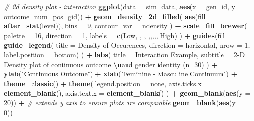 \documentclass[
]{book}
\newenvironment{Shaded}{\begin{snugshade}}{\end{snugshade}}
\newcommand{\AttributeTok}[1]{\textcolor[rgb]{0.13,0.29,0.53}{#1}}
\newcommand{\CommentTok}[1]{\textcolor[rgb]{0.56,0.35,0.01}{\textit{#1}}}
\newcommand{\DecValTok}[1]{\textcolor[rgb]{0.00,0.00,0.81}{#1}}
\newcommand{\FunctionTok}[1]{\textcolor[rgb]{0.13,0.29,0.53}{\textbf{#1}}}
\newcommand{\NormalTok}[1]{#1}
\newcommand{\SpecialCharTok}[1]{\textcolor[rgb]{0.81,0.36,0.00}{\textbf{#1}}}
\newcommand{\StringTok}[1]{\textcolor[rgb]{0.31,0.60,0.02}{#1}}
\begin{document}
\begin{Shaded}
\begin{Highlighting}[]
\CommentTok{\# 2d density plot {-} interaction}
\FunctionTok{ggplot}\NormalTok{(}\AttributeTok{data =}\NormalTok{ sim\_data, }\FunctionTok{aes}\NormalTok{(}\AttributeTok{x =}\NormalTok{ gen\_id, }\AttributeTok{y =}\NormalTok{ outcome\_num\_pos\_gid)) }\SpecialCharTok{+} 
  \FunctionTok{geom\_density\_2d\_filled}\NormalTok{(}
    \FunctionTok{aes}\NormalTok{(}\AttributeTok{fill =} \FunctionTok{after\_stat}\NormalTok{(level)), }\AttributeTok{bins =} \DecValTok{9}\NormalTok{, }\AttributeTok{contour\_var =} \StringTok{\textquotesingle{}ndensity\textquotesingle{}}
\NormalTok{    ) }\SpecialCharTok{+}
  \FunctionTok{scale\_fill\_brewer}\NormalTok{(}
    \AttributeTok{palette =} \DecValTok{16}\NormalTok{, }\AttributeTok{direction =} \DecValTok{1}\NormalTok{, }
    \AttributeTok{labels =} \FunctionTok{c}\NormalTok{(}\StringTok{\textquotesingle{}Low\textquotesingle{}}\NormalTok{, }\StringTok{\textquotesingle{}\textquotesingle{}}\NormalTok{, }\StringTok{\textquotesingle{}\textquotesingle{}}\NormalTok{, }\StringTok{\textquotesingle{}\textquotesingle{}}\NormalTok{,}\StringTok{\textquotesingle{}\textquotesingle{}}\NormalTok{,}\StringTok{\textquotesingle{}\textquotesingle{}}\NormalTok{,}\StringTok{\textquotesingle{}\textquotesingle{}}\NormalTok{,}\StringTok{\textquotesingle{}\textquotesingle{}}\NormalTok{, }\StringTok{\textquotesingle{}High\textquotesingle{}}\NormalTok{)}
\NormalTok{    ) }\SpecialCharTok{+}
  \FunctionTok{guides}\NormalTok{(}\AttributeTok{fill =} \FunctionTok{guide\_legend}\NormalTok{(}
    \AttributeTok{title =} \StringTok{\textquotesingle{}Density of Occurences\textquotesingle{}}\NormalTok{, }
    \AttributeTok{direction =} \StringTok{\textquotesingle{}horizontal\textquotesingle{}}\NormalTok{, }\AttributeTok{nrow =} \DecValTok{1}\NormalTok{, }
    \AttributeTok{label.position =} \StringTok{\textquotesingle{}bottom\textquotesingle{}}\NormalTok{)}
\NormalTok{    ) }\SpecialCharTok{+}
  \FunctionTok{labs}\NormalTok{(}
    \AttributeTok{title =} \StringTok{\textquotesingle{}Interaction Example\textquotesingle{}}\NormalTok{,}
    \AttributeTok{subtitle =} \StringTok{\textquotesingle{}2{-}D Density plot of continuous outcome }\SpecialCharTok{\textbackslash{}n}\StringTok{and gender identity (n=30)\textquotesingle{}}
\NormalTok{    ) }\SpecialCharTok{+}
  \FunctionTok{ylab}\NormalTok{(}\StringTok{"Continuous Outcome"}\NormalTok{) }\SpecialCharTok{+} \FunctionTok{xlab}\NormalTok{(}\StringTok{"Feminine {-} Masculine Continuum"}\NormalTok{) }\SpecialCharTok{+}
  \FunctionTok{theme\_classic}\NormalTok{() }\SpecialCharTok{+}
  \FunctionTok{theme}\NormalTok{(}
    \AttributeTok{legend.position =} \StringTok{\textquotesingle{}none\textquotesingle{}}\NormalTok{,}
    \AttributeTok{axis.ticks.x =} \FunctionTok{element\_blank}\NormalTok{(),}
    \AttributeTok{axis.text.x =} \FunctionTok{element\_blank}\NormalTok{()}
\NormalTok{  ) }\SpecialCharTok{+}
  \FunctionTok{geom\_blank}\NormalTok{(}\FunctionTok{aes}\NormalTok{(}\AttributeTok{y =} \DecValTok{20}\NormalTok{)) }\SpecialCharTok{+} \CommentTok{\# extends y axis to ensure plots are comparable}
  \FunctionTok{geom\_blank}\NormalTok{(}\FunctionTok{aes}\NormalTok{(}\AttributeTok{y =} \DecValTok{0}\NormalTok{))}


\end{Highlighting}
\end{Shaded}
\end{document}
